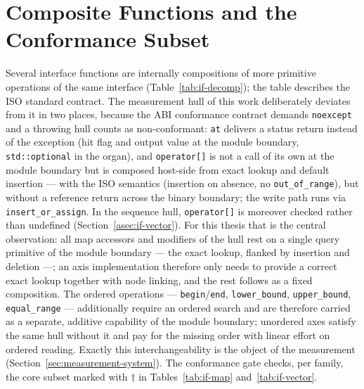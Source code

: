 \section{Composite Functions and the Conformance Subset}\label{asec:if-decomp}
Several interface functions are internally compositions of more primitive operations of the same
interface (Table~\ref{tab:if-decomp}); the table describes the ISO standard contract. The
measurement hull of this work deliberately deviates from it in two places, because the ABI
conformance contract demands \texttt{noexcept} and a throwing hull counts as non-conformant:
\texttt{at} delivers a status return instead of the exception (hit flag and output value at the
module boundary, \texttt{std::optional} in the organ), and \texttt{operator[]} is not a call of its
own at the module boundary but is composed host-side from exact lookup and default insertion ---
with the ISO semantics (insertion on absence, no \texttt{out\_of\_range}), but without a reference
return across the binary boundary; the write path runs via \texttt{insert\_or\_assign}. In the
sequence hull, \texttt{operator[]} is moreover checked rather than undefined
(Section~\ref{asec:if-vector}). For this thesis that is the central observation: all map accessors
and modifiers of the hull rest on a single query primitive of the module boundary --- the exact
lookup, flanked by insertion and deletion ---; an axis implementation therefore only needs to
provide a correct exact lookup together with node linking, and the rest follows as a fixed
composition. The ordered operations --- \texttt{begin}/\texttt{end}, \texttt{lower\_bound},
\texttt{upper\_bound}, \texttt{equal\_range} --- additionally require an ordered search and are
therefore carried as a separate, additive capability of the module boundary; unordered axes
satisfy the same hull without it and pay for the missing order with linear effort on ordered
reading. Exactly this interchangeability is the object of the measurement
(Section~\ref{sec:measurement-system}). The conformance gate checks, per family, the core subset
marked with $\dagger$ in Tables~\ref{tab:if-map} and~\ref{tab:if-vector}.

